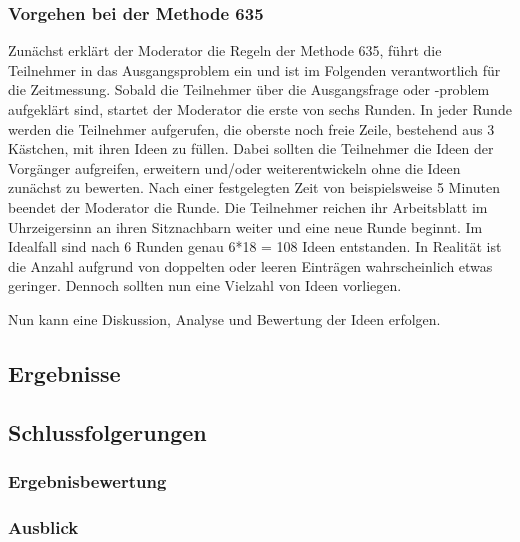 \subsubsection*{Vorgehen bei der Methode 635}
Zunächst erklärt der Moderator die Regeln der Methode 635, führt die Teilnehmer in das Ausgangsproblem ein und ist im Folgenden verantwortlich für die Zeitmessung. Sobald die Teilnehmer über die Ausgangsfrage oder -problem aufgeklärt sind, startet der Moderator die erste von sechs Runden. In jeder Runde werden die Teilnehmer aufgerufen, die oberste noch freie Zeile, bestehend aus 3 Kästchen, mit ihren Ideen zu füllen. Dabei sollten die Teilnehmer die Ideen der Vorgänger aufgreifen, erweitern und/oder weiterentwickeln ohne die Ideen zunächst zu bewerten. Nach einer festgelegten Zeit von beispielsweise 5 Minuten beendet der Moderator die Runde. Die Teilnehmer reichen ihr Arbeitsblatt im Uhrzeigersinn an ihren Sitznachbarn weiter und eine neue Runde beginnt. Im Idealfall sind nach 6 Runden genau 6*18 = 108 Ideen entstanden. In Realität ist die Anzahl aufgrund von doppelten oder leeren Einträgen wahrscheinlich etwas geringer. Dennoch sollten nun eine Vielzahl von Ideen vorliegen.


Nun kann eine Diskussion, Analyse und Bewertung der Ideen erfolgen.

\newpage



\newpage


\newpage


\newpage


\newpage


\subsection{Ergebnisse}

\subsection{Schlussfolgerungen}
\subsubsection{Ergebnisbewertung}
\subsubsection{Ausblick}